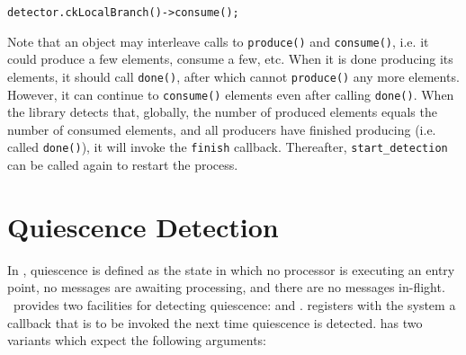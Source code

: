 \begin{alltt}
detector.ckLocalBranch()->consume();
\end{alltt}

Note that an object may interleave calls to {\tt produce()} and {\tt consume()}, i.e.
it could produce a few elements, consume a few, etc. When it is done producing its elements,
it should call {\tt done()}, after which cannot {\tt produce()} any more elements. However,
it can continue to {\tt consume()} elements even after calling {\tt done()}. 
When the library detects that, globally, the number of produced elements equals
the number of consumed elements, and all producers have finished producing
(i.e. called {\tt done()}), it will invoke the \verb|finish| callback.
Thereafter, \verb|start_detection| can be called again to restart the process.

\section{Quiescence Detection}
\label{sec:qd}

In \charmpp, quiescence is defined as the state in which no
processor is executing an entry point, no messages are awaiting processing, and
there are no messages in-flight.  \charmpp\ provides two facilities for
detecting quiescence:  and .  
registers with the system a callback that is to be invoked the next time
quiescence is detected.   has two variants
which expect the following arguments: 

